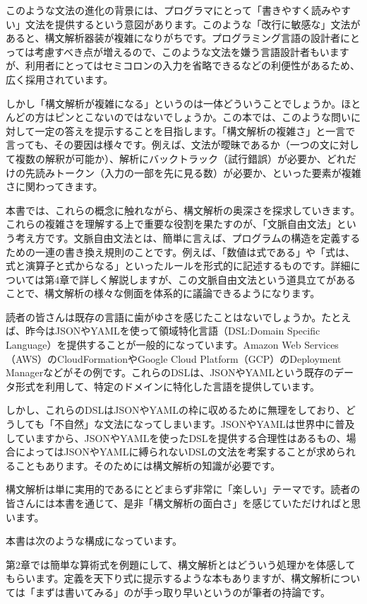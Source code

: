 このような文法の進化の背景には、プログラマにとって「書きやすく読みやすい」文法を提供するという意図があります。このような「改行に敏感な」文法があると、構文解析器装が複雑になりがちです。プログラミング言語の設計者にとっては考慮すべき点が増えるので、このような文法を嫌う言語設計者もいますが、利用者にとってはセミコロンの入力を省略できるなどの利便性があるため、広く採用されています。

しかし「構文解析が複雑になる」というのは一体どういうことでしょうか。ほとんどの方はピンとこないのではないでしょうか。この本では、このような問いに対して一定の答えを提示することを目指します。「構文解析の複雑さ」と一言で言っても、その要因は様々です。例えば、文法が曖昧であるか（一つの文に対して複数の解釈が可能か）、解析にバックトラック（試行錯誤）が必要か、どれだけの先読みトークン（入力の一部を先に見る数）が必要か、といった要素が複雑さに関わってきます。

本書では、これらの概念に触れながら、構文解析の奥深さを探求していきます。これらの複雑さを理解する上で重要な役割を果たすのが、「文脈自由文法」という考え方です。文脈自由文法とは、簡単に言えば、プログラムの構造を定義するための一連の書き換え規則のことです。例えば、「数値は式である」や「式は、式と演算子と式からなる」といったルールを形式的に記述するものです。詳細については第4章で詳しく解説しますが、この文脈自由文法という道具立てがあることで、構文解析の様々な側面を体系的に議論できるようになります。

読者の皆さんは既存の言語に歯がゆさを感じたことはないでしょうか。たとえば、昨今はJSONやYAMLを使って領域特化言語（DSL:Domain
Specific Language）を提供することが一般的になっています。Amazon Web
Services（AWS）のCloudFormationやGoogle Cloud
Platform（GCP）のDeployment
Managerなどがその例です。これらのDSLは、JSONやYAMLという既存のデータ形式を利用して、特定のドメインに特化した言語を提供しています。

しかし、これらのDSLはJSONやYAMLの枠に収めるために無理をしており、どうしても「不自然」な文法になってしまいます。JSONやYAMLは世界中に普及していますから、JSONやYAMLを使ったDSLを提供する合理性はあるもの、場合によってはJSONやYAMLに縛られないDSLの文法を考案することが求められることもあります。そのためには構文解析の知識が必要です。

構文解析は単に実用的であるにとどまらず非常に「楽しい」テーマです。読者の皆さんには本書を通じて、是非「構文解析の面白さ」を感じていただければと思います。

本書は次のような構成になっています。

第2章では簡単な算術式を例題にして、構文解析とはどういう処理かを体感してもらいます。定義を天下り式に提示するような本もありますが、構文解析については「まずは書いてみる」のが手っ取り早いというのが筆者の持論です。

